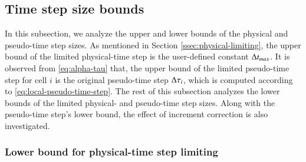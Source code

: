 \subsection{Time step size bounds}
\label{ssec:analysis-time-step}
In this subsection, we analyze the upper and lower bounds of the physical and pseudo-time step sizes. As mentioned in Section \ref{ssec:physical-limiting}, the upper bound of the limited physical-time step is the user-defined constant $\mathrm\Delta t_{max}$.
It is observed from \eqref{eq:alpha-tau} that, the upper bound of the limited pseudo-time step for cell $i$ is the original pseudo-time step $\mathrm\Delta \tau_i$, which is computed according to \eqref{eq:local-pseudo-time-step}. 
The rest of this subsection analyzes the lower bounds
of the limited physical- and pseudo-time step sizes. 
Along with the pseudo-time step's lower bound, the effect of 
increment correction is also investigated.

\subsubsection{Lower bound for physical-time step limiting}

